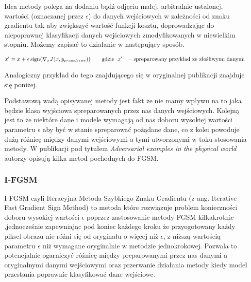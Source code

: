 \documentclass{article}
\begin{document}
    Idea metody polega na dodaniu bądź odjęciu małej, arbitralnie ustalonej, wartości (oznaczanej przez \(\epsilon\)) do
    danych wejściowych w zależności od znaku gradientu tak aby zwiększyć wartość funkcji kosztu,
    doprowadzając do niepoprawnej klasyfikacji danych wejściowych zmodyfikowanych w niewielkim stopniu.
    Możemy zapisać to działanie w następujący sposób.

    \begin{equation}
    x' = x + \epsilon\operatorname{sign}(\nabla_{x} J(x, y_{prawdziwe}))
    \qquad\text{gdzie}
    \begin{tabular}[t]{ll}
    $x'$  & -- spreparowany przykład ze złośliwymi danymi \\
    \end{tabular}
    \end{equation}

    Analogiczny przykład do tego znajdującego się w oryginalnej publikacji\cite{harnessing} znajduje się poniżej.

    Podstawową wadą opisywanej metody jest fakt że nie mamy wpływu na to jaka będzie klasa wyjściowa
    spreparowanych przez nas danych wejściowych. Kolejną jest to że niektóre dane i modele wymagają od nas
    doboru wysokiej wartości parametru $\epsilon$ aby być w stanie spreparować pożądane dane, co z kolei powoduje dużą
    różnicę między danymi wejściowymi a tymi utworzonymi w toku stosowania metody.
    W publikacji pod tytułem \textit{Adversarial examples in the physical world}\cite{DBLP:journals/corr/KurakinGB16}
    autorzy opisują kilka metod pochodnych do FGSM.

    \subsubsection{I-FGSM}
    I-FGSM czyli Iteracyjna Metoda Szybkiego Znaku Gradientu (z ang. Iterative Fast Gradient Sign Method) to metoda
    które rozwiązuje problem konieczności doboru wysokiej wartości $\epsilon$ poprzez zastosowanie metody FGSM kilkakrotnie
    ,jednocześnie zapewniając pod koniec każdego kroku że przyogotowany każdy piksel obrazu nie różni się od oryginału o więcej
    niż $\epsilon$, z niższą wartością parametru $\epsilon$ niż wymagane oryginalnie w metodzie jednokrokowej.
    Pozwala to  potencjalnie ogarniczyć różnicę między preparowanymi przez nas danymi a oryginalnymi danymi wejściowymi
    oraz przerwanie działania metody kiedy model przestania poprawnie klasyfikować dane wejściowe.
\end{document}
